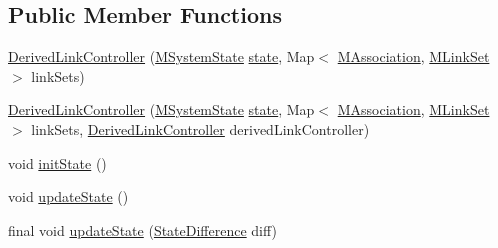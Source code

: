 \subsection*{Public Member Functions}
\begin{DoxyCompactItemize}
\item 
\hyperlink{classorg_1_1tzi_1_1use_1_1uml_1_1sys_1_1_derived_link_controller_a473424c94daeed50b72d644869e7c924}{Derived\-Link\-Controller} (\hyperlink{classorg_1_1tzi_1_1use_1_1uml_1_1sys_1_1_m_system_state}{M\-System\-State} \hyperlink{classorg_1_1tzi_1_1use_1_1uml_1_1sys_1_1_derived_link_controller_a2870a3282e4dfeb13685cc71956abf78}{state}, Map$<$ \hyperlink{interfaceorg_1_1tzi_1_1use_1_1uml_1_1mm_1_1_m_association}{M\-Association}, \hyperlink{classorg_1_1tzi_1_1use_1_1uml_1_1sys_1_1_m_link_set}{M\-Link\-Set} $>$ link\-Sets)
\item 
\hyperlink{classorg_1_1tzi_1_1use_1_1uml_1_1sys_1_1_derived_link_controller_a10f7d9826cc6a88278ca4515448e4e26}{Derived\-Link\-Controller} (\hyperlink{classorg_1_1tzi_1_1use_1_1uml_1_1sys_1_1_m_system_state}{M\-System\-State} \hyperlink{classorg_1_1tzi_1_1use_1_1uml_1_1sys_1_1_derived_link_controller_a2870a3282e4dfeb13685cc71956abf78}{state}, Map$<$ \hyperlink{interfaceorg_1_1tzi_1_1use_1_1uml_1_1mm_1_1_m_association}{M\-Association}, \hyperlink{classorg_1_1tzi_1_1use_1_1uml_1_1sys_1_1_m_link_set}{M\-Link\-Set} $>$ link\-Sets, \hyperlink{classorg_1_1tzi_1_1use_1_1uml_1_1sys_1_1_derived_link_controller}{Derived\-Link\-Controller} derived\-Link\-Controller)
\item 
void \hyperlink{classorg_1_1tzi_1_1use_1_1uml_1_1sys_1_1_derived_link_controller_a2e6137a2a303cb9dc99103ec7df2c0bf}{init\-State} ()
\item 
void \hyperlink{classorg_1_1tzi_1_1use_1_1uml_1_1sys_1_1_derived_link_controller_a17ae0c2ea352f7a70b6cd074d9ace400}{update\-State} ()
\item 
final void \hyperlink{classorg_1_1tzi_1_1use_1_1uml_1_1sys_1_1_derived_link_controller_a988cb659d5a72427a8e7530ad4ab9e32}{update\-State} (\hyperlink{classorg_1_1tzi_1_1use_1_1util_1_1soil_1_1_state_difference}{State\-Difference} diff)
\end{DoxyCompactItemize}
